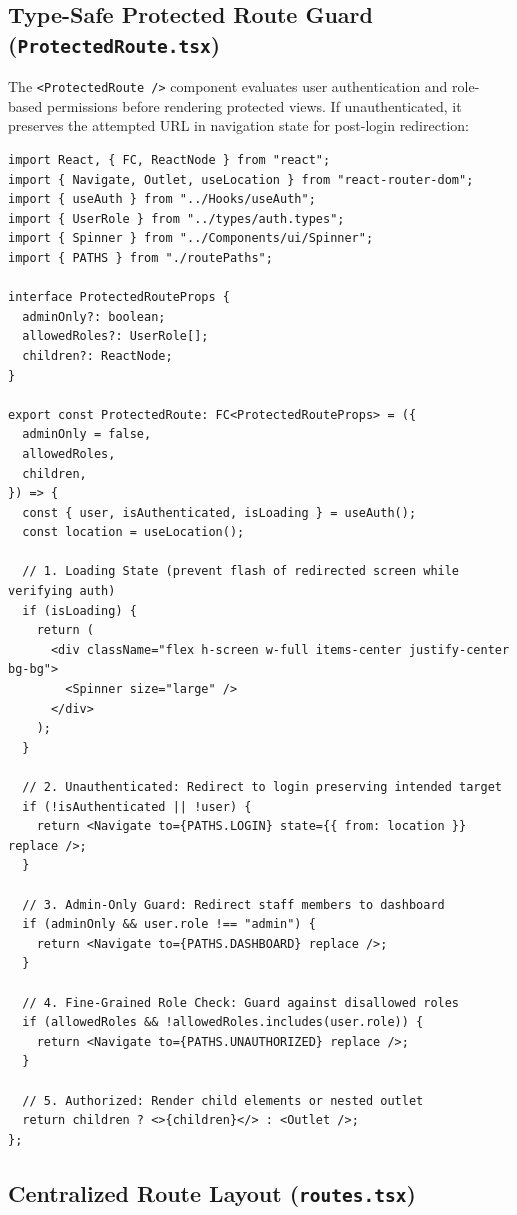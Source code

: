 \documentclass[11pt,a4paper]{article}
\begin{document}
\subsection{Type-Safe Protected Route Guard (\texttt{ProtectedRoute.tsx})}

The \texttt{<ProtectedRoute />} component evaluates user authentication and role-based permissions before rendering protected views. If unauthenticated, it preserves the attempted URL in navigation state for post-login redirection:

\begin{lstlisting}[caption={Routing/ProtectedRoute.tsx (TSX Implementation)}]
import React, { FC, ReactNode } from "react";
import { Navigate, Outlet, useLocation } from "react-router-dom";
import { useAuth } from "../Hooks/useAuth";
import { UserRole } from "../types/auth.types";
import { Spinner } from "../Components/ui/Spinner";
import { PATHS } from "./routePaths";

interface ProtectedRouteProps {
  adminOnly?: boolean;
  allowedRoles?: UserRole[];
  children?: ReactNode;
}

export const ProtectedRoute: FC<ProtectedRouteProps> = ({
  adminOnly = false,
  allowedRoles,
  children,
}) => {
  const { user, isAuthenticated, isLoading } = useAuth();
  const location = useLocation();

  // 1. Loading State (prevent flash of redirected screen while verifying auth)
  if (isLoading) {
    return (
      <div className="flex h-screen w-full items-center justify-center bg-bg">
        <Spinner size="large" />
      </div>
    );
  }

  // 2. Unauthenticated: Redirect to login preserving intended target
  if (!isAuthenticated || !user) {
    return <Navigate to={PATHS.LOGIN} state={{ from: location }} replace />;
  }

  // 3. Admin-Only Guard: Redirect staff members to dashboard
  if (adminOnly && user.role !== "admin") {
    return <Navigate to={PATHS.DASHBOARD} replace />;
  }

  // 4. Fine-Grained Role Check: Guard against disallowed roles
  if (allowedRoles && !allowedRoles.includes(user.role)) {
    return <Navigate to={PATHS.UNAUTHORIZED} replace />;
  }

  // 5. Authorized: Render child elements or nested outlet
  return children ? <>{children}</> : <Outlet />;
};
\end{lstlisting}

\subsection{Centralized Route Layout (\texttt{routes.tsx})}
\end{document}
